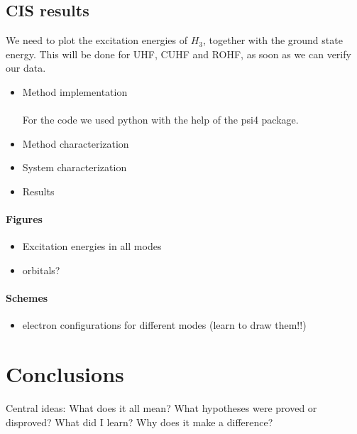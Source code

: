 \documentclass[twoside,twocolumn,9pt]{article}
\renewcommand{\refname}{Notes and references}
\begin{document}
\subsection{CIS results}
We need to plot the excitation energies of $H_3$, together with the ground state energy. This will be done for UHF, CUHF and ROHF, as soon as we can verify our data.
\begin{itemize}
    \item Method implementation
    \paragraph*{}
    For the code we used python with the help of the psi4 package.
    \item Method characterization
    \item System characterization
    \item Results
\end{itemize}
\paragraph*{Figures}
\begin{itemize}
    \item Excitation energies in all modes 
    \item orbitals?
\end{itemize}
\paragraph*{Schemes}
\begin{itemize}
  \item electron configurations for different modes (learn to draw them!!)
\end{itemize}



\section{Conclusions}

Central ideas: What does it all mean? What hypotheses were proved or disproved? What did I learn? Why does it make a difference?




\balance


\end{document}
